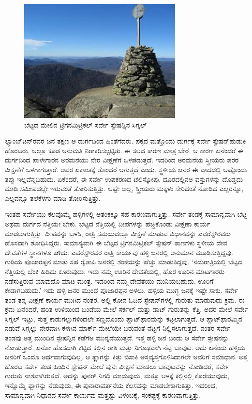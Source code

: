 \begin{figure}[!htbp]
\includegraphics[scale=0.7]{"images/image016.jpg"}
\caption{ಬೆಟ್ಟದ ಮೇಲಿನ ಟ್ರಿಗನಮಿಟ್ರಿಕಲ್​ ಸರ್ವೇ ಸ್ಟೇಷನ್ನಿನ ಸಿಗ್ನಲ್​}\label{art12-fig1}
\end{figure}

\newpage

ಲ್ಯಾಂಬ್​ಟನ್​ರವರ ಜನ ತಕ್ಷಣ ಆ ದುರ್ಗದಿಂದ ಹಿಂತೆಗೆದರು. ಪಕ್ಕದ ಮತ್ತೊಂದು ದುರ್ಗಕ್ಕೆ ಸರ್ವೇ ಸ್ಟೇಷನ್​ ಹುಡುಕಿ ಹೊರಟರು. ಅಲ್ಲೂ ಕೂಡ ಅನುಮತಿ ನಿರಾಕರಿಸಲ್ಪಟ್ಟಿತು. ಈ ಸಲದ ಕಾರಣ ಮಾತ್ರ ಬೇರೆ. ಆ ಕಾರಣ ಏನೆಂದರೆ ಈ ದುರ್ಗದಿಂದ ಪಾಳೇಗಾರನ ಅರಮನೆಯು ನೇರ ವೀಕ್ಷಣೆಗೆ ಒಳಪಡುತ್ತದೆ. ಇದರಿಂದ ಅರಮನೆಯ ಸ್ತ್ರೀಯರು ಪರರ ವೀಕ್ಷಣೆಗೆ ಒಳಗಾಗುತ್ತಾರೆ. ಅವರ ಏಕಾಂತಕ್ಕೆ ತೊಂದರೆ ಆಗುತ್ತದೆ ಎಂದು. ಸ್ಥಳೀಯ ಜನರ ಈ ವಾದದಲ್ಲಿ ಅಷ್ಟೊಂದು ತಪ್ಪು ಇಲ್ಲವೆನ್ನಬಹುದು. ಏಕೆಂದರೆ, ಈ ಸರ್ವೇ ಉಪಕರಣದ ಟೆಲಿಸ್ಕೋಪು, ದೂರದಲ್ಲಿನಅ ವಸ್ತುಗಳನ್ನು ದೊಡ್ಡದು ಮಾಡಿ ಸಮೀಪದಲ್ಲೇ ಇರುವಂತೆ ತೋರಿಸುತ್ತಿತ್ತು. ಅಷ್ಟೇ ಅಲ್ಲ, ಸ್ತ್ರೀಯರು ಮಕ್ಕಳು ಸೇರಿದಂತೆ ನೋಡಿದ ಎಲ್ಲರನ್ನೂ, ಎಲ್ಲವನ್ನೂ ತಲೆಕೆಳಗು ಮಾಡಿ ತೋರಿಸುತ್ತಿತ್ತು.

ಇಂತಹ ಸರ್ವೇಯು ಕೆಲವೊಮ್ಮೆ ಹಳ್ಳಿಗಳಲ್ಲಿ ಆತಂಕಕ್ಕೂ ಸಹ ಕಾರಣವಾಗುತ್ತಿತ್ತು. ಸರ್ವೇ ತಂಡಕ್ಕೆ ಸಾಮಾನ್ಯವಾಗಿ ಬೆಟ್ಟ ಅಥವಾ ದುರ್ಗದ ನೆತ್ತಿಯೇ ಬೇಕು. ಬೆಟ್ಟದ ನೆತ್ತಿಯಲ್ಲಿ ದೀಪಗಳನ್ನು ಹಚ್ಚಿಕೊಂಡು ವೀಕ್ಷಣಾ ಕಾರ್ಯ ಮಾಡಲಾಗುತ್ತಿತ್ತು. ದೀಪವನ್ನು ಬಳಸಿ, ರಾತ್ರಿ ಸಮಯದಲ್ಲೂ ವೀಕ್ಷಣೆ ಮಾಡುವ ವಿಧಾನವನ್ನು ಎವರೆಸ್ಟ್​ರವರು ಹೊಸದಾಗಿ ಶೋಧಿಸಿದ್ದರು. ಸಾಮಾನ್ಯವಾಗಿ ಈ ಬೆಟ್ಟದ ಟ್ರಿಗನಮಿಟ್ರಿಕಲ್​ ಸ್ಟೇಷನ್​ ತಾಣಗಳು ಸ್ಥಳೀಯ ದೇವ ದೇವತೆಗಳ ಸ್ಥಾನಗಳೂ ಹೌದು. ಎವರೆಸ್ಟ್​ರವರ ರಾತ್ರಿ ಕಾರ್ಯವು ಹಳ್ಳಿ ಜನರಲ್ಲಿ ಅನುಮಾನ ಮೂಡಿಸುತ್ತಿದ್ದವು. ಗುಡಿಯ ಪೂಜಾರಪ್ಪನ ಮಾತು ಸಹ ರೈತಾಪಿ ಜನರಲ್ಲಿ ಶಂಕೆಯನ್ನು ಹೆಚ್ಚು ಮಾಡುತಿದ್ದವು. ‘ನಡುರಾತ್ರಿಯಲ್ಲಿ ಬೆಟ್ಟದ ನೆತ್ತಿಯಲ್ಲಿ ಬೆಂಕಿ ಹಿಡಿದು ಕೂರುವುದು, ಇದು ನಮ್ಮ ಊರಿನ ದೇವತೆಯಲ್ಲಿ, ಹೊರ ಊರಿನ ಮಾಟಗಾರರು ನಡೆಸುತ್ತಿರುವ ಯಾವುದೊ ಮಾಟ ಮಂತ್ರ. ಇದರಿಂದ ನಮ್ಮ ದೇವತೆಯು ಮುನಿಯಬಹುದು. ಊರಿಗೆ ಕೇಡಾಗಬಹುದು.’ ಇದು ಹಳ್ಳಿ ಜನರ ಮುಂದೆ ಪೂಜಾರಪ್ಪನ ಅಳಲು. ಹಳ್ಳಿಯ ಮುಗ್ಧ ಜನಕ್ಕೆ ಇಷ್ಟೇ ಸಾಕು. ಸರ್ವೇ ತಂಡ ತನ್ನ ವೀಕ್ಷಣೆ ಕಾರ್ಯ ಮುಗಿದ ನಂತರ, ಅಲ್ಲಿ ಕೋನ ಓದಿದ ಸ್ಟೇಷನ್​ಗಳಲ್ಲಿ ಗುರುತು ಮಾಡುವುದು ಕ್ರಮ. ಈ ಕ್ರಮ ಏನೆಂದರೆ, ಹರಿತ ಉಳಿಯಿಂದ ಬಂಡೆಯ ಮೇಲೆ ಸರ್ಕಲ್​ ಮತ್ತು ಡಾಟ್​ ಗುರುತನ್ನು ಕೆತ್ತಿ, ಅದರ ಮೇಲೆ ಸರ್ವೇ ಸಿಗ್ನಲ್​ ಇಟ್ಟು, ಸುತ್ತ ಕಾಡುಗಲ್ಲುಗಳಿಂದಲೇ ಸಣ್ಣದೊಂದು ಪ್ಲಾಟ್​ಫಾರಮನ್ನು ಕಟ್ಟಲಾಗುತ್ತದೆ. ಆ ಪ್ಲಾಟ್​ಫಾರಮ್ಮಿನ ನಡುವೆ ಸಿಗ್ನಲ್ಲು ನೇರವಾಗಿ ಕೆಳಗಿನ ಮಾರ್ಕ್ ಮೇಲೆಯೇ ಬರುವಂತೆ ನೆಟ್ಟಗೆ ನಿಲ್ಲಿಸಲಾಗುತ್ತದೆ. ನಂತರ ಸರ್ವೇ ತಂಡವು ಅತ್ತ ಮುಂದಿನ ಸ್ಟೇಷನ್ನಿನ ಕಡೆಗೆಅ ಮುನ್ನಡೆಯುತ್ತದೆ. ಇತ್ತ ಹಳ್ಳಿ ಜನ ಬಂದು ಆ ಸರ್ವೇ ಸ್ಟೇಷನನ್ನು ನೋಡುತ್ತಾರೆ. ಏನೋ ಹೊಸದಾಗಿ ಕಟ್ಟಿದ ಕಲ್ಲಿನ ರಾಶಿ ಮತ್ತು ನಿಗೂಢವಾಗಿ ನೆಟ್ಟ ಬಾವುಟ. ಅದು ಏನೆಂದು ಹಳ್ಳಿಯ ಜನರಿಗೆ ಒಂದೂ ಅರ್ಥವಾಗುವುದಿಲ್ಲ. ಆ ಫ್ಲಾಗನ್ನು ಕಿತ್ತು ಬಿಸಾಕಿ ಅಸ್ತವ್ಯಸ್ತಗೊಳಿಸಿದಾಗಲೇ ಅವರಿಗೆ ಸಮಾಧಾನ. ಅತ್ತ ಹೊರಟ ಸರ್ವೇ ತಂಡ ಹಿಂದಿನ ಸ್ಟೇಷನ್​ ಮೇಲೆ ಪುನಃ ವೀಕ್ಷಣೆ ಮಾಡಲು ಬಾವುಟವನ್ನು ನೋಡಿದರೆ, ಸರ್ವೇ ಗುರುತು ನಾಶವಾಗಿರುತ್ತದೆ. ಅದನ್ನು ಪುನರ್​ ನಿಗಧಿ ಮಾಡುವುದು, ಮತ್ತೂ ಆಳಕ್ಕೆ ಕಲ್ಲಿನಲ್ಲಿ ಕೊರೆಯುವುದು, ಇನ್ನೊಮ್ಮೆ ಫ್ಲಾಗನ್ನು ನೆಡುವುದು, ಈ ಪುನಾರಾವರ್ತನೆಯ ಕೆಲಸವನ್ನು ಮಾಡಬೇಕಾಗುತಿತ್ತು. ಇದರಿಂದ, ಸಾಮಾನ್ಯವಾಗಿ ನಿಧಾನದ ಸರ್ವೇ ಕಾರ್ಯವು ಮತ್ತಷ್ಟು ವಿಳಂಬಕ್ಕೆ, ಸಂಕಷ್ಟಕ್ಕೆ ಕಾರಣವಾಗುತ್ತಿತ್ತು.


